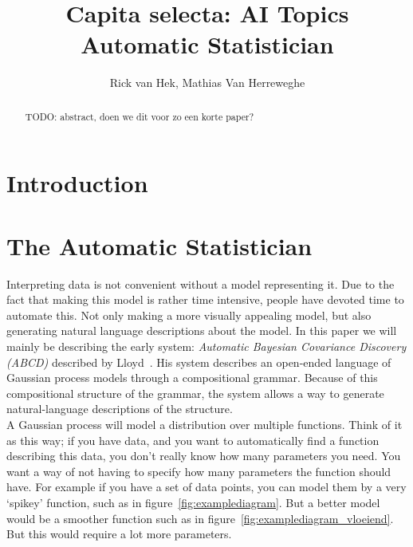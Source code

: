 \documentclass[a4paper, 10pt, conference]{ieeeconf}
\title{\LARGE \textbf{Capita selecta: AI Topics} \\ 
Automatic Statistician}
\author{Rick van Hek, Mathias Van Herreweghe}
\begin{document}
\maketitle
\thispagestyle{empty}
\pagestyle{empty}


\begin{abstract}
    TODO: abstract, doen we dit voor zo een korte paper?
\end{abstract}

\tableofcontents


\section{Introduction}
\section{The Automatic Statistician}
Interpreting data is not convenient without a model representing it. Due to the fact that making this model is rather time intensive, people have devoted time to automate this. Not only making a more visually appealing model, but also generating natural language descriptions about the model. In this paper we will mainly be describing the early system: \textit{Automatic Bayesian Covariance Discovery (ABCD)} described by Lloyd~\cite{lloyd2014automatic}. His system describes an open-ended language of Gaussian process models through a compositional grammar. Because of this compositional structure of the grammar, the system allows a way to generate natural-language descriptions of the structure. \\

A Gaussian process will model a distribution over multiple functions. Think of it as this way; if you have data, and you want to automatically find a function describing this data, you don't really know how many parameters you need. You want a way of not having to specify how many parameters the function should have. For example if you have a set of data points, you can model them by a very `spikey' function, such as in figure~\ref{fig:examplediagram}. But a better model would be a smoother function such as in figure~\ref{fig:examplediagram_vloeiend}. But this would require a lot more parameters.
\end{document}
